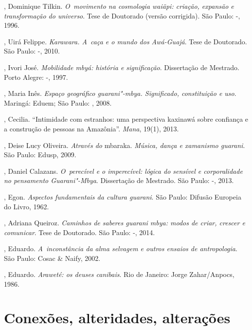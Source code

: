 \begin{Parskip}
, Dominique Tilkin. \emph{O~movimento na cosmologia waiãpi:
criação, expansão e transformação do universo}. Tese de Doutorado
(versão corrigida). São Paulo: -, 1996.

, Uirá Felippe. \emph{Karawara. A~caça e o mundo dos Awá-Guajá}.
Tese de Doutorado. São Paulo: -, 2010.

, Ivori José. \emph{Mobilidade mbyá: história e significação}.
Dissertação de Mestrado. Porto Alegre: -, 1997.

, Maria Inês. \emph{Espaço geográfico guarani"-mbya. Significado,
constituição e uso}. Maringá: Eduem; São Paulo: , 2008.

, Cecilia. ``Intimidade com estranhos: uma perspectiva
kaxinawá sobre confiança e a construção de pessoas na Amazônia''. \emph{Mana},
19(1), 2013.

, Deise Lucy Oliveira. \emph{Através do} mbaraka. \emph{Música, dança e
xamanismo guarani}. São Paulo: Edusp, 2009.

, Daniel Calazans. \emph{O~perecível e o imperecível: lógica do
sensível e corporalidade no pensamento Guarani"-Mbya}. Dissertação de
Mestrado. São Paulo: -, 2013.

, Egon. \emph{Aspectos fundamentais da cultura guarani}. São
Paulo: Difusão Europeia do Livro, 1962.

, Adriana Queiroz. \emph{Caminhos de saberes guarani mbya: modos de
criar, crescer e comunicar}. Tese de Doutorado. São Paulo: -,
2014.

, Eduardo. \emph{A~inconstância da alma selvagem e
outros ensaios de antropologia}. São Paulo: Cosac \& Naify, 2002.

, Eduardo. \emph{Araweté: os deuses canibais}. Rio de
Janeiro: Jorge Zahar/Anpocs, 1986.

\end{Parskip}

\makeatletter\@openrightfalse
\movetooddpage
\part{Conexões, alteridades, alterações}
 
